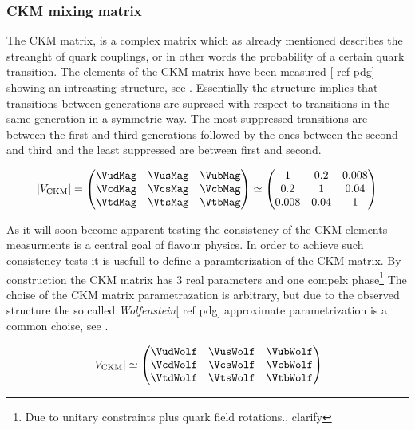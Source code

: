 \subsubsection{CKM mixing matrix}
The CKM matrix, is a complex matrix which as already mentioned describes the streanght of quark couplings,
or in other words the probability of a certain quark transition. The elements of the CKM matrix have been measured [{\color{red} ref pdg}]
showing an intreasting structure, see . Essentially the structure implies that transitions between generations
are supresed with respect to transitions in the same generation in a symmetric way. The most suppressed transitions are between
the first and third generations followed by the ones between the second and third and the least suppressed are between first and second.

\begin{equation}
  |V_{\text{CKM}}|
                   = \begin{pmatrix} \VudMag & \VusMag & \VubMag \\ \VcdMag & \VcsMag & \VcbMag \\ \VtdMag & \VtsMag & \VtbMag \end{pmatrix}
              \simeq \begin{pmatrix} 1 & 0.2 & 0.008 \\ 0.2 & 1 & 0.04 \\ 0.008 & 0.04 & 1 \end{pmatrix}
      \label{CKMmatrix}
  \end{equation}

As it will soon become apparent testing the consistency of the CKM elements measurments is a central goal of flavour physics.
In order to achieve such consistency tests it is usefull to define a paramterization of the CKM matrix.
By construction the CKM matrix has 3 real parameters and one compelx phase\footnote{Due to unitary constraints plus quark field rotations.,{\color{red} clarify}}
The choise of the CKM matrix parametrazation is arbitrary, but due to the observed structure the so called {\it Wolfenstein}[{\color{red} ref pdg}]
approximate parametrization is a common choise, see .

\begin{equation}
  |V_{\text{CKM}}|
                   \simeq \begin{pmatrix} \VudWolf & \VusWolf & \VubWolf \\
                                          \VcdWolf & \VcsWolf & \VcbWolf \\
                                          \VtdWolf & \VtsWolf & \VtbWolf \end{pmatrix}
      \label{CKMwolfenstein}
\end{equation}

